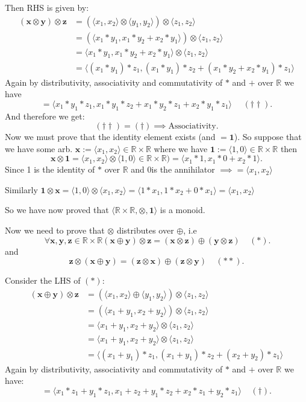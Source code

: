\documentclass[a4paper]{article}
\begin{document}
Then RHS is given by:
\begin{align*}
     (\bm{x} \otimes \bm{y}) \otimes \bm{z} &=  (\langle x_1, x_2 \rangle \otimes \langle y_1, y_2 \rangle) \otimes \langle z_1, z_2 \rangle\\ 
 &=  (\langle x_1 * y_1, x_1 * y_2 + x_2 * y_1 \rangle) \otimes \langle z_1, z_2 \rangle\\ 
 &=  \langle x_1 * y_1, x_1 * y_2 + x_2 * y_1 \rangle \otimes \langle z_1, z_2 \rangle\\ 
 &=  \langle (x_1 * y_1) * z_1, (x_1 * y_1) * z_2 + (x_1 * y_2 + x_2 * y_1) * z_1 \rangle
\end{align*}
Again by distributivity, associativity and commutativity of $*$  and $+$ over  $\mathbb{R}$ we have
\[
= \langle x_1 * y_1 * z_1, x_1 * y_1 * z_2 + x_1 * y_2 * z_1 + x_2 * y_1 * z_1\rangle  ~ ~ ~ ~ ~ ~ (\dag\dag)
.\]
And therefore we get:
\[
    (\dag\dag) = (\dag) \implies \text{Associativity}
.\]
Now we must prove that the identity element exists (and $= \bm{1}$).
So suppose that we have some arb. $\bm{x} := \langle x_1, x_2 \rangle \in \mathbb{R}\times\mathbb{R}$
where we have $\bm{1} := \langle 1, 0 \rangle \in \mathbb{R}\times\mathbb{R}$
then
\[
\bm{x} \otimes \bm{1} = \langle x_1, x_2 \rangle \otimes \langle 1, 0 \rangle \in \mathbb{R}\times\mathbb{R})
= \langle x_1 * 1, x_1 * 0 + x_2 * 1 \rangle
.\]
Since 1 is the identity of $*$ over $\mathbb{R}$ and $0$is the annihilator $\implies = \langle x_1, x_2 \rangle$

Similarly $\bm{1} \otimes \bm{x} = \langle 1, 0 \rangle \otimes \langle x_1, x_2 \rangle = \langle 1 * x_1, 1*x_2 + 0*x_1 \rangle = \langle x_1, x_2 \rangle$

So we have now proved that $\langle \mathbb{R}\times\mathbb{R}, \otimes, \bm{1} \rangle$ is a monoid.

Now we need to prove that $\otimes$ distributes over $\oplus$, i.e
\[
~\forall \bm{x}, \bm{y}, \bm{z} \in \mathbb{R}\times\mathbb{R} (\bm{x} \oplus \bm{y}) \otimes \bm{z} = (\bm{x} \otimes \bm{z}) \oplus (\bm{y} \otimes \bm{z}) ~ ~ ~ ~ ~ (*)
.\]
and
\[
    \bm{z} \otimes (\bm{x} \oplus \bm{y}) = (\bm{z} \otimes \bm{x}) \oplus (\bm{z} \otimes \bm{y}) ~ ~ ~ ~ ~ (**)
.\]

Consider the LHS of $(*)$:
\begin{align*}
     (\bm{x} \oplus \bm{y}) \otimes\bm{z} &=  (\langle x_1, x_2 \rangle \oplus \langle y_1, y_2 \rangle) \otimes \langle z_1, z_2 \rangle\\ 
 &=  (\langle x_1 + y_1, x_2 + y_2 \rangle) \otimes \langle z_1, z_2 \rangle\\ 
 &=  \langle x_1 + y_1, x_2 + y_2 \rangle \otimes \langle z_1, z_2 \rangle\\ 
 &=  \langle x_1 + y_1, x_2 + y_2 \rangle \otimes \langle z_1, z_2 \rangle\\ 
 &=  \langle (x_1 + y_1) * z_1, (x_1 + y_1) * z_2 + (x_2 + y_2) * z_1 \rangle
\end{align*}
Again by distributivity, associativity and commutativity of $*$ and $+$ over $\mathbb{R}$ we have:
\[
= \langle x_1 * z_1 + y_1 * z_1, x_1 + z_2 + y_1 * z_2+ x_2 * z_1 + y_2 * z_1 \rangle ~ ~ ~ ~ ~ (\dag)
.\]
\end{document}
